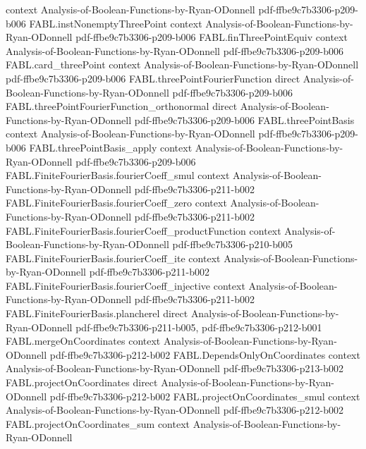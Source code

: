 \begin{theorem}
  {context}
  {Analysis-of-Boolean-Functions-by-Ryan-ODonnell}
  {pdf-ffbe9c7b3306-p209-b006}
\proofstep
  {FABL.instNonemptyThreePoint}
  {context}
  {Analysis-of-Boolean-Functions-by-Ryan-ODonnell}
  {pdf-ffbe9c7b3306-p209-b006}
\proofstep
  {FABL.finThreePointEquiv}
  {context}
  {Analysis-of-Boolean-Functions-by-Ryan-ODonnell}
  {pdf-ffbe9c7b3306-p209-b006}
\proofstep
  {FABL.card_threePoint}
  {context}
  {Analysis-of-Boolean-Functions-by-Ryan-ODonnell}
  {pdf-ffbe9c7b3306-p209-b006}
\proofstep
  {FABL.threePointFourierFunction}
  {direct}
  {Analysis-of-Boolean-Functions-by-Ryan-ODonnell}
  {pdf-ffbe9c7b3306-p209-b006}
\proofstep
  {FABL.threePointFourierFunction_orthonormal}
  {direct}
  {Analysis-of-Boolean-Functions-by-Ryan-ODonnell}
  {pdf-ffbe9c7b3306-p209-b006}
\proofstep
  {FABL.threePointBasis}
  {context}
  {Analysis-of-Boolean-Functions-by-Ryan-ODonnell}
  {pdf-ffbe9c7b3306-p209-b006}
\proofstep
  {FABL.threePointBasis_apply}
  {context}
  {Analysis-of-Boolean-Functions-by-Ryan-ODonnell}
  {pdf-ffbe9c7b3306-p209-b006}
\proofstep
  {FABL.FiniteFourierBasis.fourierCoeff_smul}
  {context}
  {Analysis-of-Boolean-Functions-by-Ryan-ODonnell}
  {pdf-ffbe9c7b3306-p211-b002}
\proofstep
  {FABL.FiniteFourierBasis.fourierCoeff_zero}
  {context}
  {Analysis-of-Boolean-Functions-by-Ryan-ODonnell}
  {pdf-ffbe9c7b3306-p211-b002}
\proofstep
  {FABL.FiniteFourierBasis.fourierCoeff_productFunction}
  {context}
  {Analysis-of-Boolean-Functions-by-Ryan-ODonnell}
  {pdf-ffbe9c7b3306-p210-b005}
\proofstep
  {FABL.FiniteFourierBasis.fourierCoeff_ite}
  {context}
  {Analysis-of-Boolean-Functions-by-Ryan-ODonnell}
  {pdf-ffbe9c7b3306-p211-b002}
\proofstep
  {FABL.FiniteFourierBasis.fourierCoeff_injective}
  {context}
  {Analysis-of-Boolean-Functions-by-Ryan-ODonnell}
  {pdf-ffbe9c7b3306-p211-b002}
\proofstep
  {FABL.FiniteFourierBasis.plancherel}
  {direct}
  {Analysis-of-Boolean-Functions-by-Ryan-ODonnell}
  {pdf-ffbe9c7b3306-p211-b005,
    pdf-ffbe9c7b3306-p212-b001}
\proofstep
  {FABL.mergeOnCoordinates}
  {context}
  {Analysis-of-Boolean-Functions-by-Ryan-ODonnell}
  {pdf-ffbe9c7b3306-p212-b002}
\proofstep
  {FABL.DependsOnlyOnCoordinates}
  {context}
  {Analysis-of-Boolean-Functions-by-Ryan-ODonnell}
  {pdf-ffbe9c7b3306-p213-b002}
\proofstep
  {FABL.projectOnCoordinates}
  {direct}
  {Analysis-of-Boolean-Functions-by-Ryan-ODonnell}
  {pdf-ffbe9c7b3306-p212-b002}
\proofstep
  {FABL.projectOnCoordinates_smul}
  {context}
  {Analysis-of-Boolean-Functions-by-Ryan-ODonnell}
  {pdf-ffbe9c7b3306-p212-b002}
\proofstep
  {FABL.projectOnCoordinates_sum}
  {context}
  {Analysis-of-Boolean-Functions-by-Ryan-ODonnell}

\end{theorem}
